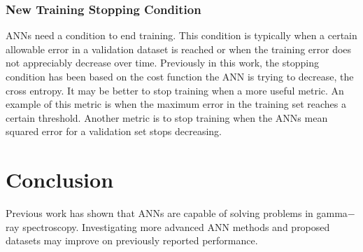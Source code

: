 \documentclass[tocnosub,noragright,centerchapter,12pt,fullpage]{uiucecethesis09}
\begin{document}
\subsection{New Training Stopping Condition}

ANNs need a condition to end training. This condition is typically when a certain allowable error in a validation dataset is reached or when the training error does not appreciably decrease over time. Previously in this work, the stopping condition has been based on the cost function the ANN is trying to decrease, the cross entropy. It may be better to stop training when a more useful metric. An example of this metric is when the maximum error in the training set reaches a certain threshold. Another metric is to stop training when the ANNs mean squared error for a validation set stops decreasing.



\chapter{Conclusion}

Previous work has shown that ANNs are capable of solving problems in gamma$-$ray spectroscopy. Investigating more advanced ANN methods and proposed datasets may improve on previously reported performance.








\end{document}
